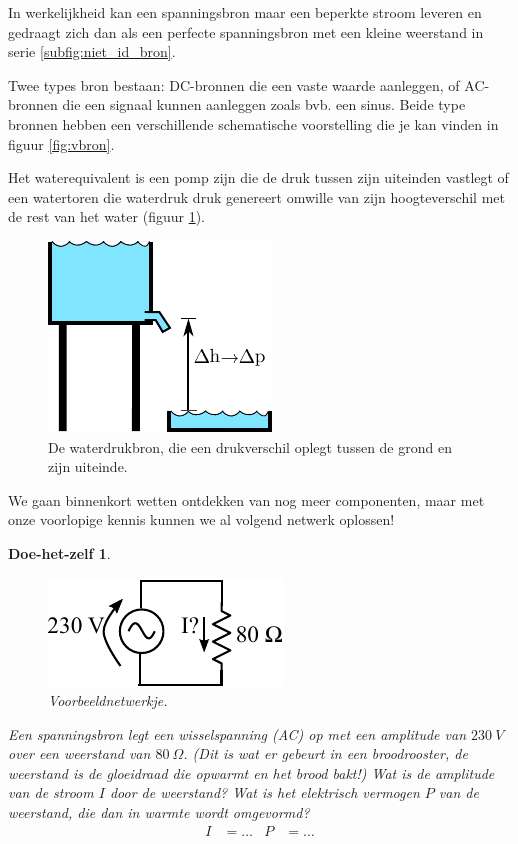 \documentclass{article}
\newtheorem{DIY}{Doe-het-zelf}
\begin{document}
			 In werkelijkheid kan een spanningsbron maar een beperkte stroom leveren en gedraagt zich dan als een perfecte spanningsbron met een kleine weerstand in serie \ref{subfig:niet_id_bron}. 
			 
			 Twee types bron bestaan: DC-bronnen die een vaste waarde aanleggen, of AC-bronnen die een signaal kunnen aanleggen zoals bvb. een sinus. Beide type bronnen hebben een verschillende schematische voorstelling die je kan vinden in figuur \ref{fig:vbron}.

			 Het waterequivalent is een pomp zijn die de druk tussen zijn uiteinden vastlegt of een watertoren die waterdruk druk genereert omwille van zijn hoogteverschil met de rest van het water (figuur \ref{fig:waterbron}).

		\begin{figure}[htbp]
				\centering
				\includegraphics{waterbron}
				\caption{De waterdrukbron, die een drukverschil oplegt tussen de grond en zijn uiteinde.}
				\label{fig:waterbron}
			\end{figure}

			We gaan binnenkort wetten ontdekken van nog meer componenten, maar met onze voorlopige kennis kunnen we al volgend netwerk oplossen!

		
			\begin{DIY} 
			\begin{figure}[h!]
				\centering
				\includegraphics{vbweerstand.pdf}
				\caption{Voorbeeldnetwerkje.}
				\label{fig:vbweerstand}
			\end{figure}
			Een spanningsbron legt een wisselspanning (AC) op met een amplitude van $230~V$ over een weerstand van $80~\Omega$. (Dit is wat er gebeurt in een broodrooster, de weerstand is de gloeidraad die opwarmt en het brood bakt!) Wat is de amplitude van de  stroom $I$ door de weerstand? Wat is het elektrisch vermogen $P$ van de weerstand, die dan in warmte wordt omgevormd?
			\begin{align}
			    I&= \ldots & P&= \ldots 
			\end{align}
			\end{DIY}
\end{document}
